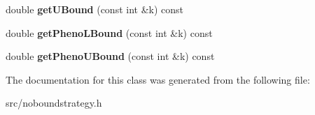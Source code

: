 \begin{DoxyCompactItemize}
\item 
\hypertarget{classlibcmaes_1_1NoBoundStrategy_a2a0a9467aeb6b57749cc73499bf40620}{double {\bfseries get\+U\+Bound} (const int \&k) const }\label{classlibcmaes_1_1NoBoundStrategy_a2a0a9467aeb6b57749cc73499bf40620}

\item 
\hypertarget{classlibcmaes_1_1NoBoundStrategy_a5b2514ff34ef3e7a5392a615cbdb2b45}{double {\bfseries get\+Pheno\+L\+Bound} (const int \&k) const }\label{classlibcmaes_1_1NoBoundStrategy_a5b2514ff34ef3e7a5392a615cbdb2b45}

\item 
\hypertarget{classlibcmaes_1_1NoBoundStrategy_a324683037bd85f4e03c2fc2d5ea624ff}{double {\bfseries get\+Pheno\+U\+Bound} (const int \&k) const }\label{classlibcmaes_1_1NoBoundStrategy_a324683037bd85f4e03c2fc2d5ea624ff}

\end{DoxyCompactItemize}


The documentation for this class was generated from the following file\+:\begin{DoxyCompactItemize}
\item 
src/noboundstrategy.\+h\end{DoxyCompactItemize}
